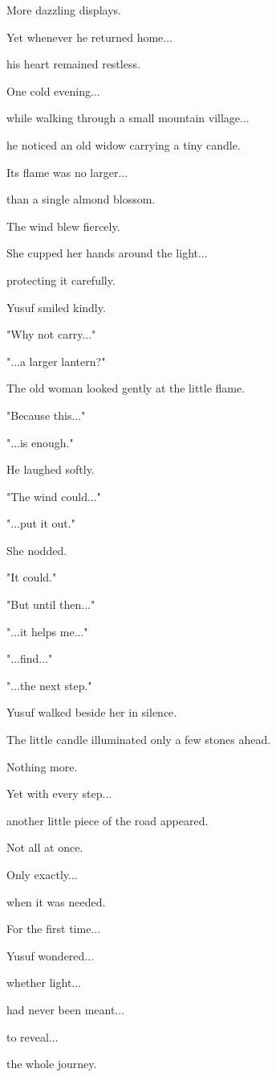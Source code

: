 \documentclass[12pt,openany]{book}
\begin{document}
More dazzling displays.

Yet whenever he returned home...

his heart remained restless.

One cold evening...

while walking through a small mountain village...

he noticed an old widow carrying a tiny candle.

Its flame was no larger...

than a single almond blossom.

The wind blew fiercely.

She cupped her hands around the light...

protecting it carefully.

Yusuf smiled kindly.

"Why not carry..."

"...a larger lantern?"

The old woman looked gently at the little flame.

"Because this..."

"...is enough."

He laughed softly.

"The wind could..."

"...put it out."

She nodded.

"It could."

"But until then..."

"...it helps me..."

"...find..."

"...the next step."

Yusuf walked beside her in silence.

The little candle illuminated only a few stones ahead.

Nothing more.

Yet with every step...

another little piece of the road appeared.

Not all at once.

Only exactly...

when it was needed.

For the first time...

Yusuf wondered...

whether light...

had never been meant...

to reveal...

the whole journey.
\end{document}

